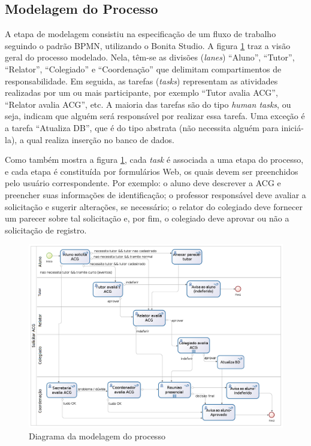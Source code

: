 \documentclass[12pt]{article}
\begin{document}
\subsection{Modelagem do Processo}

A etapa de modelagem consistiu na especificação de um fluxo de trabalho seguindo o padrão BPMN, utilizando o Bonita Studio. A figura \ref{fig:diagrama} traz a visão geral do processo modelado. Nela, têm-se as divisões (\emph{lanes}) “Aluno”, “Tutor”, “Relator”, “Colegiado” e “Coordenação” que delimitam compartimentos de responsabilidade. Em seguida, as tarefas  (\emph{tasks})  representam as atividades realizadas por um ou mais participante, por exemplo “Tutor avalia ACG”, “Relator avalia ACG”, etc. A maioria das tarefas são do tipo \emph{human tasks}, ou seja, indicam que alguém será responsável por realizar essa tarefa. Uma exceção é a tarefa “Atualiza DB”, que é do tipo abstrata (não necessita alguém para iniciá-la), a qual realiza inserção no banco de dados.

Como também mostra a figura \ref{fig:diagrama}, cada \emph{task}  é associada a uma etapa do processo, e cada etapa é constituída  por formulários Web, os quais devem ser preenchidos pelo usuário correspondente. Por exemplo: o aluno deve  descrever  a ACG e preencher  suas  informações  de  identificação;  o professor responsável deve avaliar a solicitação e sugerir alterações, se necessário; o relator do colegiado deve fornecer um parecer sobre tal solicitação e, por fim, o colegiado deve aprovar ou não a solicitação de registro.

\begin{figure}[ht]
\centering
\includegraphics[width=.99\textwidth]{images/processo.png}
\caption{Diagrama da modelagem do processo}
\label{fig:diagrama}
\end{figure}
\end{document}

